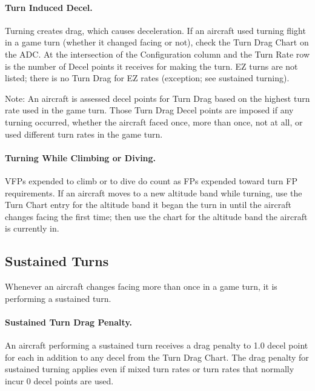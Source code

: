 \paragraph{Turn Induced Decel.} Turning creates drag, which causes deceleration. If an aircraft used turning flight in a game turn (whether it changed facing or not), check the Turn Drag Chart on the ADC. At the intersection of the Configuration column and the Turn Rate row is the number of Decel points it receives for making the turn. EZ turns are not listed; there is no Turn Drag for EZ rates (exception; see sustained turning). 

Note: An aircraft is assessed decel points for Turn Drag based on the highest turn rate used in the game turn. Those Turn Drag Decel points are imposed if any turning occurred, whether the aircraft faced once, more than once, not at all, or used different turn rates in the game turn.



\paragraph{Turning While Climbing or Diving.} VFPs expended to climb or to dive do count as FPs expended toward turn FP requirements. If an aircraft moves to a new altitude band while turning, use the Turn Chart entry for the altitude band it began the turn in until the aircraft changes facing the first time; then use the chart for the altitude band the aircraft is currently in.

\advancedrules

\subsection{Sustained Turns}

Whenever an aircraft changes facing more than once in a game turn, it is performing a sustained turn.

\paragraph{Sustained Turn Drag Penalty.} An aircraft performing a sustained turn receives a drag penalty to 1.0 decel point for each  in addition to any decel from the Turn Drag Chart. The drag penalty for sustained turning applies even if mixed turn rates or turn rates that normally incur 0 decel points are used.  

